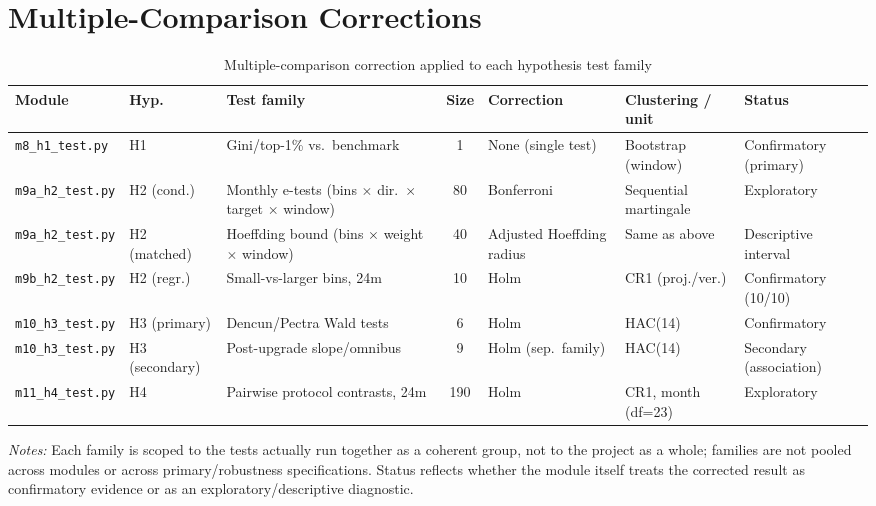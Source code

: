 \documentclass[pdflatex, sn-basic]{sn-jnl}
\theoremstyle{thmstylethree}%
\begin{document}
    \appendix
    \section{Multiple-Comparison Corrections}
    \label{app:multiplicity}
    
    \begin{table}[htbp]
    \centering
    \footnotesize
    \caption{Multiple-comparison correction applied to each hypothesis test family}
    \label{tab:multiplicity}
    \begin{tabularx}{\linewidth}{@{}llXcXXX@{}}
    \toprule
    Module & Hyp. & Test family & Size & Correction & Clustering / unit & Status \\
    \midrule
    \texttt{m8\_h1\_test.py} & H1 & Gini/top-1\% vs.\ benchmark & 1 & None (single test) & Bootstrap (window) & Confirmatory (primary) \\
    \texttt{m9a\_h2\_test.py} & H2 (cond.) & Monthly e-tests (bins $\times$ dir.\ $\times$ target $\times$ window) & 80 & Bonferroni & Sequential martingale & Exploratory \\
    \texttt{m9a\_h2\_test.py} & H2 (matched) & Hoeffding bound (bins $\times$ weight $\times$ window) & 40 & Adjusted Hoeffding radius & Same as above & Descriptive interval \\
    \texttt{m9b\_h2\_test.py} & H2 (regr.) & Small-vs-larger bins, 24m & 10 & Holm & CR1 (proj./ver.) & Confirmatory (10/10) \\
    \texttt{m10\_h3\_test.py} & H3 (primary) & Dencun/Pectra Wald tests & 6 & Holm & HAC(14) & Confirmatory \\
    \texttt{m10\_h3\_test.py} & H3 (secondary) & Post-upgrade slope/omnibus & 9 & Holm (sep.\ family) & HAC(14) & Secondary (association) \\
    \texttt{m11\_h4\_test.py} & H4 & Pairwise protocol contrasts, 24m & 190 & Holm & CR1, month (df=23) & Exploratory \\
    \bottomrule
    \end{tabularx}
    \vspace{0.2cm}
    \begin{minipage}{\linewidth}
    \small
    \textit{Notes:} Each family is scoped to the tests actually run together as a coherent group, not to the project as a whole; families are not pooled across modules or across primary/robustness specifications. Status reflects whether the module itself treats the corrected result as confirmatory evidence or as an exploratory/descriptive diagnostic.
    \end{minipage}
    \end{table}
    
    \FloatBarrier
    
    
\end{document}

